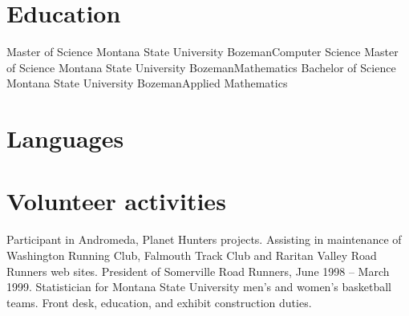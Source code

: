 \documentclass[11pt]{moderncv}  %
\begin{document}
\section{Education}
    {Master of Science}
    {Montana State University}
    {Bozeman}{}{Computer Science}
    {Master of Science}
    {Montana State University}
    {Bozeman}{}{Mathematics}
    {Bachelor of Science}
    {Montana State University}
    {Bozeman}{}{Applied Mathematics}

\section{Languages}

\section{Volunteer activities}
  {Participant in Andromeda, Planet Hunters projects.}
  {Assisting in maintenance of Washington Running Club, Falmouth
  Track Club and Raritan Valley Road Runners web sites.
   President of Somerville Road Runners, June 1998 -- March 1999.}
  {Statistician for Montana State University men's and women's basketball
  teams.}
  {Front desk, education, and exhibit construction duties.}
\end{document}
